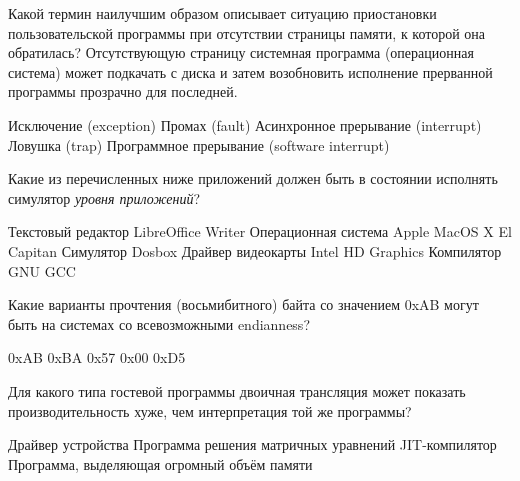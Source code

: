 \documentclass[a4paper, addpoints]{exam}
\begin{document}
\begin{questions}


\question[2] Какой термин наилучшим образом описывает ситуацию приостановки пользовательской программы при отсутствии страницы памяти, к которой она обратилась? Отсутствующую страницу системная программа (операционная система) может подкачать с диска и затем возобновить исполнение прерванной программы прозрачно для последней.
\begin{choices}
\choice Исключение (exception)
\correctchoice Промах (fault)
\choice Асинхронное прерывание (interrupt)
\choice Ловушка (trap)
\choice Программное прерывание (software interrupt)
\end{choices}


\question[2] Какие из перечисленных ниже приложений должен быть в состоянии исполнять симулятор \textit{уровня приложений}?
\begin{choices}
\correctchoice Текстовый редактор LibreOffice Writer
\choice Операционная система Apple MacOS X El Capitan
\correctchoice Симулятор Dosbox
\choice Драйвер видеокарты Intel HD Graphics
\correctchoice Компилятор GNU GCC
\end{choices}

\question[2] Какие варианты прочтения (восьмибитного) байта со значением 0xAB могут быть на системах со всевозможными endianness?
\begin{choices}
\correctchoice 0xAB
\choice 0xBA
\choice 0x57
\choice 0x00
\choice 0xD5
\end{choices}

\question[2] Для какого типа гостевой программы двоичная трансляция может показать производительность хуже, чем интерпретация той же программы?
\begin{choices}
\choice Драйвер устройства
\choice Программа решения матричных уравнений
\correctchoice JIT-компилятор
\choice Программа, выделяющая огромный объём памяти
\end{choices}

\newpage
\phantom{Blank page}

\end{questions}
\end{document}
